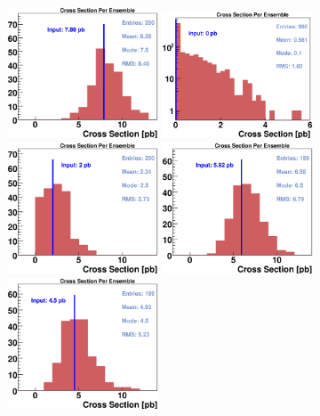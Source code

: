 \vspace{0.1in}
\begin{figure}[!h!tbp]
\includegraphics[width=0.40\textwidth]{eps/MatrixElement/ensembles/EnsemblesA}
\includegraphics[width=0.40\textwidth]{eps/MatrixElement/ensembles/Ensembles0sig1}
\includegraphics[width=0.40\textwidth]{eps/MatrixElement/ensembles/EnsemblesC}
\includegraphics[width=0.40\textwidth]{eps/MatrixElement/ensembles/EnsemblesD}
\includegraphics[width=0.40\textwidth]{eps/MatrixElement/ensembles/Ensembles4.5.eps}

\end{figure}
